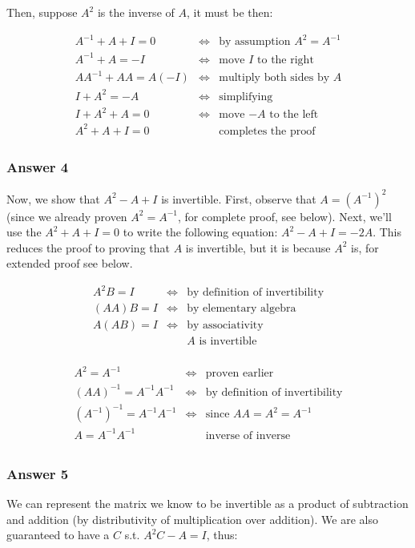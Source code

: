 \documentclass[11pt]{article}
\begin{document}
Then, suppose $A^2$ is the inverse of $A$, it must be then:

\begin{align*}
  A^{-1} + A + I = 0   & \iff     & \textrm{by assumption $A^2=A^{-1}$} \\
  A^{-1} + A = -I      & \iff     & \textrm{move $I$ to the right} \\
  AA^{-1} + AA = A(-I) & \iff     & \textrm{multiply both sides by $A$} \\
  I + A^2 = -A         & \iff     & \textrm{simplifying} \\
  I + A^2 + A = 0      & \iff     & \textrm{move $-A$ to the left} \\
  A^2 + A + I = 0      &          & \textrm{completes the proof}
\end{align*}
\subsubsection{Answer 4}
\label{sec-1-3-2}
Now, we show that $A^2-A+I$ is invertible. First, observe that
$A=(A^{-1})^2$ (since we already proven $A^2=A^{-1}$, for complete proof,
see below).  Next, we'll use the $A^2+A+I=0$ to write the following
equation: $A^2-A+I=-2A$.  This reduces the proof to proving that $A$ is
invertible, but it is because $A^2$ is, for extended proof see below.

\begin{align*}
  A^2B  = I & \iff & \textrm{by definition of invertibility} \\
  (AA)B = I & \iff & \textrm{by elementary algebra} \\
  A(AB) = I & \iff & \textrm{by associativity} \\
            &      & \textrm{$A$ is invertible} \\
\end{align*}

\begin{align*}
  A^2  = A^{-1}                & \iff & \textrm{proven earlier} \\
  (AA)^{-1} = A^{-1}A^{-1}     & \iff & \textrm{by definition of invertibility} \\
  (A^{-1})^{-1} = A^{-1}A^{-1} & \iff & \textrm{since $AA = A^2 = A^{-1}$} \\
  A = A^{-1}A^{-1}             &      & \textrm{inverse of inverse} \\
\end{align*}
\subsubsection{Answer 5}
\label{sec-1-3-3}
We can represent the matrix we know to be invertible as a product of
subtraction and addition (by distributivity of multiplication over addition).
We are also guaranteed to have a $C$ s.t. $A^2C-A=I$, thus:
\end{document}

